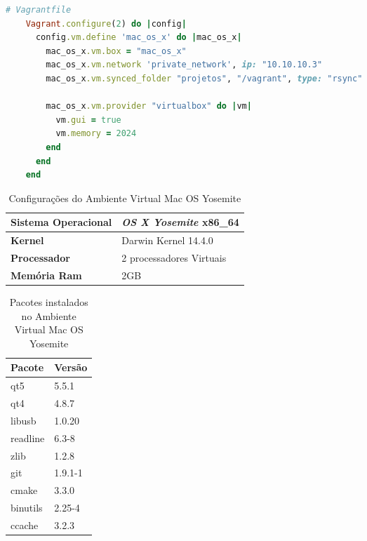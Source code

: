 \begin{itemize}
\begin{lstlisting}[language=ruby, caption={Vagrantfile com configurações da máquina virtual Mac OS Yosemite},
                  label=vagrant_mac_os_x]
    # Vagrantfile
    Vagrant.configure(2) do |config|
      config.vm.define 'mac_os_x' do |mac_os_x|
        mac_os_x.vm.box = "mac_os_x"
        mac_os_x.vm.network 'private_network', ip: "10.10.10.3"
        mac_os_x.vm.synced_folder "projetos", "/vagrant", type: "rsync"

        mac_os_x.vm.provider "virtualbox" do |vm|
          vm.gui = true
          vm.memory = 2024
        end
      end
    end

\end{lstlisting}

\begin{table}[h]
\centering
\caption{Configurações do Ambiente Virtual Mac OS Yosemite}
\label{especificacoes_mac_os_x}
\begin{tabular}{ll}
\textbf{Sistema Operacional} & \textit{OS X Yosemite} x86\_64  \\ \toprule
\textbf{Kernel} & Darwin Kernel  14.4.0  \\ \midrule 
\textbf{Processador} & 2 processadores Virtuais \\ \midrule
\textbf{Memória Ram} & 2GB  \\ \bottomrule 
\end{tabular} 
\end{table}


\begin{table}[h]
\centering
\caption{Pacotes instalados no Ambiente Virtual Mac OS Yosemite}
\label{pacotes_instalados_mac_os_x}
\begin{tabular}{ll}
\textbf{Pacote} & \textbf{Versão} \\ \toprule
qt5 & 5.5.1 \\ \midrule 
qt4 & 4.8.7 \\ \midrule 
libusb & 1.0.20 \\ \midrule 
readline & 6.3-8 \\ \midrule
zlib & 1.2.8 \\ \midrule
git & 1.9.1-1 \\ \midrule
cmake & 3.3.0  \\ \midrule
binutils & 2.25-4 \\ \midrule
ccache & 3.2.3 \\ \bottomrule
\end{tabular} 
\end{table}


\end{itemize}
